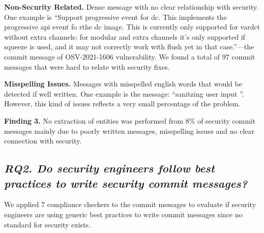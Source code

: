 \textbf{Non-Security Related.} Dense message with no clear relationship with security. One example is 
``Support progressive event for dc. This implements the progressive api event fo rthe dc image. This is currently only supported for vardct without extra channels: for
modular and extra channels it's only supported if squeeze is used, and
it may not correctly work with flush yet in that case.''---the commit message of OSV-2021-1606 vulnerability.
We found a total of $97$ commit messages that were hard to relate with security fixes. 

\textbf{Misspelling Issues.} Messages with misspelled english words that would be detected if well written. One example is the message: ``sanitzing user input ''.
However, this kind of issues reflects a very small percentage of the problem.




\textbf{Finding 3.} No extraction of entities was performed from $8\%$ of security commit messages mainly due to poorly written messages, misspelling issues and no clear connection with security.


\subsection*{\textit{RQ2.  Do security engineers follow best practices to write security commit
messages?}}

We applied $7$ compliance checkers to the commit messages to evaluate if security engineers are using generic best practices to write commit messages since no standard for security exists.

